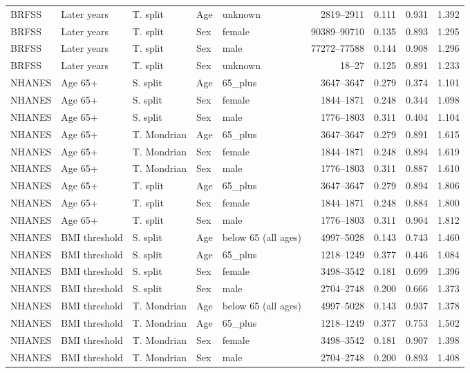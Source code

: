 \begin{longtable}{L{0.9cm}L{1.55cm}L{1.45cm}L{1.1cm}L{1.8cm}r r r r}
BRFSS & Later years & T. split & Age & unknown & 2819--2911 & 0.111 & 0.931 & 1.392 \\
BRFSS & Later years & T. split & Sex & female & 90389--90710 & 0.135 & 0.893 & 1.295 \\
BRFSS & Later years & T. split & Sex & male & 77272--77588 & 0.144 & 0.908 & 1.296 \\
BRFSS & Later years & T. split & Sex & unknown & 18--27 & 0.125 & 0.891 & 1.233 \\
NHANES & Age 65+ & S. split & Age & 65\_plus & 3647--3647 & 0.279 & 0.374 & 1.101 \\
NHANES & Age 65+ & S. split & Sex & female & 1844--1871 & 0.248 & 0.344 & 1.098 \\
NHANES & Age 65+ & S. split & Sex & male & 1776--1803 & 0.311 & 0.404 & 1.104 \\
NHANES & Age 65+ & T. Mondrian & Age & 65\_plus & 3647--3647 & 0.279 & 0.891 & 1.615 \\
NHANES & Age 65+ & T. Mondrian & Sex & female & 1844--1871 & 0.248 & 0.894 & 1.619 \\
NHANES & Age 65+ & T. Mondrian & Sex & male & 1776--1803 & 0.311 & 0.887 & 1.610 \\
NHANES & Age 65+ & T. split & Age & 65\_plus & 3647--3647 & 0.279 & 0.894 & 1.806 \\
NHANES & Age 65+ & T. split & Sex & female & 1844--1871 & 0.248 & 0.884 & 1.800 \\
NHANES & Age 65+ & T. split & Sex & male & 1776--1803 & 0.311 & 0.904 & 1.812 \\
NHANES & BMI threshold & S. split & Age & below 65 (all ages) & 4997--5028 & 0.143 & 0.743 & 1.460 \\
NHANES & BMI threshold & S. split & Age & 65\_plus & 1218--1249 & 0.377 & 0.446 & 1.084 \\
NHANES & BMI threshold & S. split & Sex & female & 3498--3542 & 0.181 & 0.699 & 1.396 \\
NHANES & BMI threshold & S. split & Sex & male & 2704--2748 & 0.200 & 0.666 & 1.373 \\
NHANES & BMI threshold & T. Mondrian & Age & below 65 (all ages) & 4997--5028 & 0.143 & 0.937 & 1.378 \\
NHANES & BMI threshold & T. Mondrian & Age & 65\_plus & 1218--1249 & 0.377 & 0.753 & 1.502 \\
NHANES & BMI threshold & T. Mondrian & Sex & female & 3498--3542 & 0.181 & 0.907 & 1.398 \\
NHANES & BMI threshold & T. Mondrian & Sex & male & 2704--2748 & 0.200 & 0.893 & 1.408 \\

\end{longtable}
